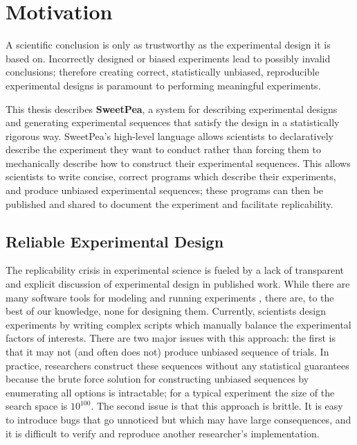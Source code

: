 
\chapter{Motivation}

A scientific conclusion is only as trustworthy as the experimental design it is based on. Incorrectly designed or biased experiments lead to possibly invalid conclusions; therefore creating correct, statistically unbiased, reproducible experimental designs is paramount to performing meaningful experiments.

This thesis describes \textbf{SweetPea}, a system for describing experimental designs and generating experimental sequences that satisfy the design in a statistically rigorous way. SweetPea's high-level language allows scientists to declaratively describe the experiment they want to conduct rather than forcing them to mechanically describe how to construct their experimental sequences. This allows scientists to write concise, correct programs which describe their experiments, and produce unbiased experimental sequences; these programs can then be published and shared to document the experiment and facilitate replicability.

\section{Reliable Experimental Design}

The replicability crisis in experimental science is fueled by a lack of transparent and explicit discussion of experimental design in published work. While there are many software tools for modeling and running experiments \cite{cohen1993psyscope} \cite{mathot2012opensesame} \cite{peirce2009generating}, there are, to the best of our knowledge, none for designing them. Currently, scientists design experiments by writing complex scripts which manually balance the experimental factors of interests. There are two major issues with this approach: the first is that it may not (and often does not) produce unbiased sequence of trials. In practice, researchers construct these sequences without any statistical guarantees because the brute force solution for constructing unbiased sequences by enumerating all options is intractable; for a typical experiment the size of the search space is $10^{100}$. The second issue is that this approach is brittle. It is easy to introduce bugs that go unnoticed but which may have large consequences, and it is difficult to verify and reproduce another researcher's implementation.

